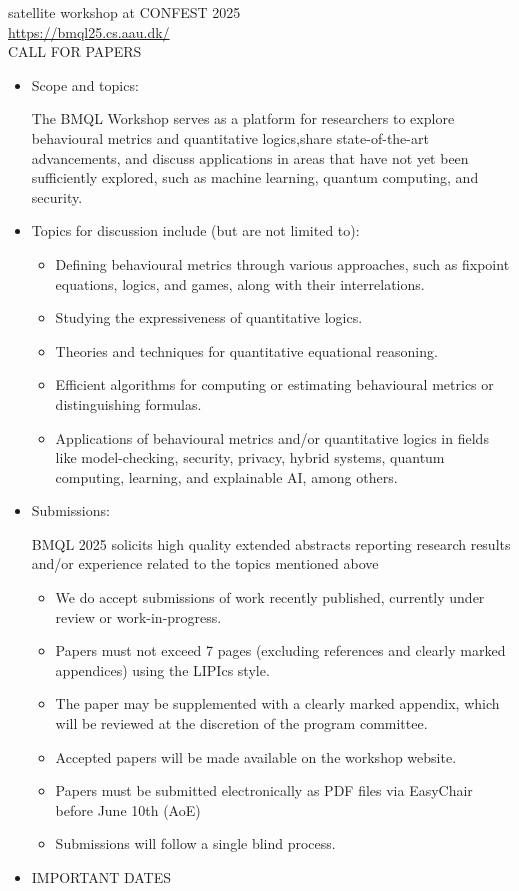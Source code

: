 \documentclass[prodmode,acmtecs]{acmsmall} %
\begin{document}
  satellite workshop at CONFEST 2025\\ 
  \href{https://bmql25.cs.aau.dk/}{https://bmql25.cs.aau.dk/}\\ 
CALL FOR PAPERS 

\begin{itemize}\item  Scope and topics:  
 
  The BMQL Workshop serves as a platform for researchers to explore behavioural metrics and quantitative logics,share state-of-the-art advancements, and discuss applications in areas that have not yet been sufficiently explored, such as machine learning, quantum computing, and security. 
 
\item  Topics for discussion include (but are not limited to): 
 
\begin{itemize}\item  Defining behavioural metrics through various approaches, such as fixpoint equations, logics, and games, along with their interrelations.
\item  Studying the expressiveness of quantitative logics.
\item  Theories and techniques for quantitative equational reasoning.
\item  Efficient algorithms for computing or estimating behavioural metrics or distinguishing formulas.
\item  Applications of behavioural metrics and/or quantitative logics in fields like model-checking, security, privacy, hybrid systems, quantum computing, learning, and explainable AI, among others.
\end{itemize} 
\item  Submissions:  
 
  BMQL 2025 solicits high quality extended abstracts reporting research results and/or experience related to the topics mentioned above 
 
\begin{itemize}\item  We do accept submissions of work recently published, currently under review or work-in-progress.
\item  Papers must not exceed 7 pages (excluding references and clearly marked appendices) using the LIPIcs style.
\item  The paper may be supplemented with a clearly marked appendix, which will be reviewed at the discretion of the program committee.
\item  Accepted papers will be made available on the workshop website.
\item  Papers must be submitted electronically as PDF files via EasyChair before June 10th (AoE)
\item  Submissions will follow a single blind process.
\end{itemize} 
\item  IMPORTANT DATES 
 

\end{itemize}
\end{document}
